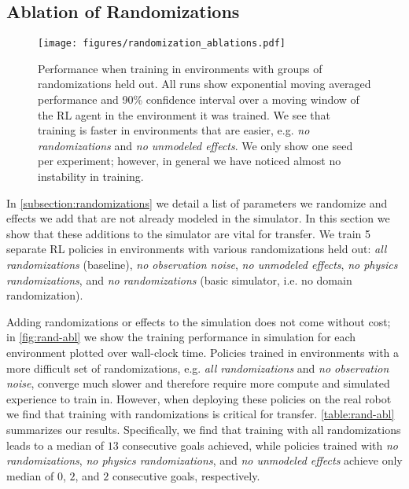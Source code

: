 \subsection{Ablation of Randomizations}
\label{sec:ablation-rand}

\begin{figure}[h]
    \begin{minipage}[c]{0.55\textwidth}
        \texttt{[image: figures/randomization\_ablations.pdf]}
    \end{minipage}\hfill
    \begin{minipage}[c]{0.45\textwidth}
        \caption{Performance when training in environments with groups of randomizations held out. All runs show exponential moving averaged performance and 90\% confidence interval over a moving window of the RL agent in the environment it was trained. We see that training is faster in environments that are easier, e.g. \textit{no randomizations} and \textit{no unmodeled effects}. We only show one seed per experiment; however, in general we have noticed almost no instability in training.
        }
        \label{fig:rand-abl}
    \end{minipage}\hfill
\end{figure}

In \autoref{subsection:randomizations} we detail a list of parameters we randomize and effects we add that are not already modeled in the simulator. In this section we show that these additions to the simulator are vital for transfer. We train 5 separate RL policies in environments with various randomizations held out: \textit{all randomizations} (baseline), \textit{no observation noise}, \textit{no unmodeled effects}, \textit{no physics randomizations}, and \textit{no randomizations} (basic simulator, i.e. no domain randomization).

Adding randomizations or effects to the simulation does not come without cost; in \autoref{fig:rand-abl} we show the training performance in simulation for each environment plotted over wall-clock time. Policies trained in environments with a more difficult set of randomizations, e.g. \textit{all randomizations} and \textit{no observation noise}, converge much slower and therefore require more compute and simulated experience to train in. However, when deploying these policies on the real robot we find that training with randomizations is critical for transfer. \autoref{table:rand-abl} summarizes our results.
Specifically, we find that training with all randomizations leads to a median of $13$ consecutive goals achieved, while policies trained with \textit{no randomizations}, \textit{no physics randomizations}, and \textit{no unmodeled effects} achieve only median of $0$, $2$, and $2$ consecutive goals, respectively.

